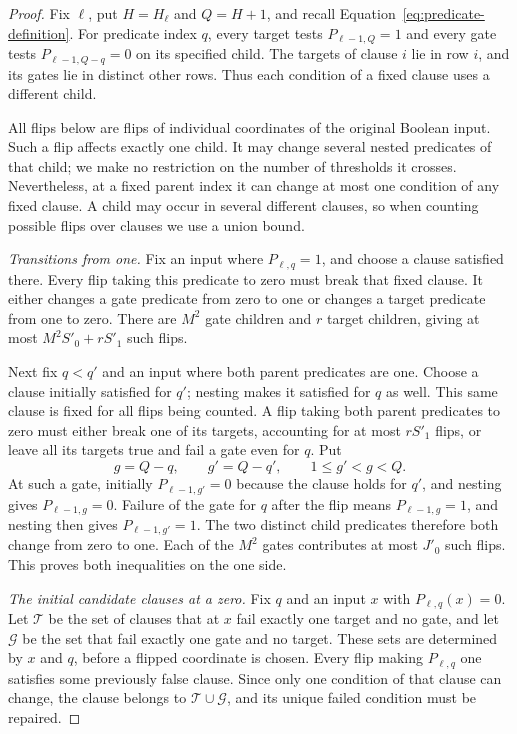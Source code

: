 \begin{proof}
Fix $\ell$, put $H=H_\ell$ and $Q=H+1$, and recall
Equation~\eqref{eq:predicate-definition}.  For predicate index $q$, every
target tests $P_{\ell-1,Q}=1$ and every gate tests
$P_{\ell-1,Q-q}=0$ on its specified child.  The targets of clause $i$
lie in row $i$, and its gates lie in distinct other rows.  Thus each
condition of a fixed clause uses a different child.

All flips below are flips of individual coordinates of the original
Boolean input.  Such a flip affects exactly one child.  It may change
several nested predicates of that child; we make no restriction on the
number of thresholds it crosses.  Nevertheless, at a fixed parent index
it can change at most one condition of any fixed clause.  A child may
occur in several different clauses, so when counting possible flips
over clauses we use a union bound.

\emph{Transitions from one.}
Fix an input where $P_{\ell,q}=1$, and choose a clause satisfied there.
Every flip taking this predicate to zero must break that fixed clause.
It either changes a gate predicate from zero to one or changes a target
predicate from one to zero.  There are $M^2$ gate children and $r$
target children, giving at most $M^2S'_0+rS'_1$ such flips.

Next fix $q<q'$ and an input where both parent predicates are one.
Choose a clause initially satisfied for $q'$; nesting makes it satisfied
for $q$ as well.  This same clause is fixed for all flips being counted.
A flip taking both parent predicates to zero must either break one of
its targets, accounting for at most $rS'_1$ flips, or leave all its
targets true and fail a gate even for $q$.  Put
\[
 g=Q-q,\qquad g'=Q-q',\qquad 1\leq g'<g<Q.
\]
At such a gate, initially $P_{\ell-1,g'}=0$ because the clause holds
for $q'$, and nesting gives $P_{\ell-1,g}=0$.  Failure of the gate for
$q$ after the flip means $P_{\ell-1,g}=1$, and nesting then gives
$P_{\ell-1,g'}=1$.  The two distinct child predicates therefore both
change from zero to one.  Each of the $M^2$ gates contributes at most
$J'_0$ such flips.  This proves both inequalities on the one side.

\emph{The initial candidate clauses at a zero.}
Fix $q$ and an input $x$ with $P_{\ell,q}(x)=0$.  Let $\mathcal T$
be the set of clauses that at $x$ fail exactly one target and no gate,
and let $\mathcal G$ be the set that fail exactly one gate and no
target.  These sets are determined by $x$ and $q$, before a flipped
coordinate is chosen.  Every flip making $P_{\ell,q}$ one satisfies
some previously false clause.  Since only one condition of that clause
can change, the clause belongs to $\mathcal T\cup\mathcal G$, and
its unique failed condition must be repaired.


\end{proof}
